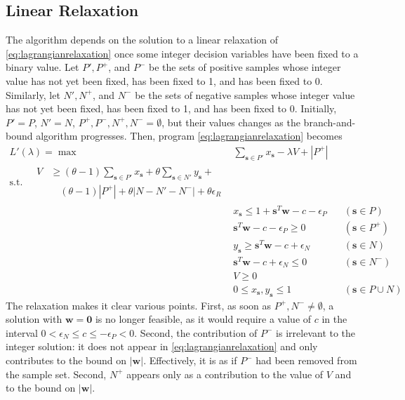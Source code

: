 \documentclass[11pt]{article}
\theoremstyle{definition}
\newcommand{\vect}[1]{\mathbf{#1}}
\newcommand{\sv}[1]{_{\vect{#1}}}
\begin{document}
\subsection{Linear Relaxation}
The algorithm depends on the solution to a linear relaxation of 
\eqref{eq:lagrangianrelaxation} once some integer decision variables
have been fixed to a binary value.
Let $P', P^+$, and $P^-$ be the sets of positive samples whose integer value
has not yet been fixed, has been fixed to 1, and has been fixed to 0.
Similarly, let 
$N', N^+$, and $N^-$ be the sets of negative samples whose integer value
has not yet been fixed, has been fixed to 1, and has been fixed to 0.
Initially, $P' = P$, $N' = N$, $P^+, P^-, N^+, N^- = \emptyset$, but their
values changes as the branch-and-bound algorithm progresses.
Then, program \eqref{eq:lagrangianrelaxation} becomes
\begin{subequations}
\label{eq:linearrelaxation}
\begin{align}
\label{eq:linearrelaxationobj}
L'(\lambda) = \max\quad & \sum_{\vect{s} \in P'} x\sv{s} - \lambda V + |P^+| \\
\text{s.t.}\quad  
\label{eq:linearrelaxationprecision}
\begin{split}
V & \geq (\theta  - 1) \sum_{\vect{s} \in P'} x\sv{s} + 
\theta \sum_{\vect{s} \in N'} y\sv{s} + \\
& \quad (\theta - 1) |P^+| + \theta |N - N' - N^-| + \theta \epsilon_R
\end{split} \\
& x\sv{s} \leq 1 + \vect{s}^T \vect{w} - c - \epsilon_P & & (\vect{s} \in P) \\
& \vect{s}^T \vect{w} - c - \epsilon_P \geq 0 & & (\vect{s} \in P^+) \\
& y\sv{s} \geq \vect{s}^T \vect{w} - c + \epsilon_N & & (\vect{s} \in N) \\
& \vect{s}^T \vect{w} - c + \epsilon_N \leq 0 & & (\vect{s} \in N^-) \\
& V \geq 0 \\
& 0 \leq x\sv{s}, y\sv{s} \leq 1 & & (\vect{s} \in P \cup N) 
\end{align}
\end{subequations}
The relaxation makes it clear various points.
First, as soon as $P^+, N^- \neq \emptyset$, 
a solution with $\vect{w} = \vect{0}$ is no longer feasible,
as it would require a value of $c$ in the interval
$0 < \epsilon_N \leq c \leq - \epsilon_P < 0$.
Second, the contribution of $P^-$ is irrelevant to the integer solution:
it does not appear in \eqref{eq:lagrangianrelaxation}
and only contributes to the bound on $|\vect{w}|$. 
Effectively, it is as if $P^-$ had been removed from the sample set.
Second, $N^+$ appears only as a contribution to the value of $V$
and to the bound on $|\vect{w}|$.
\end{document}
